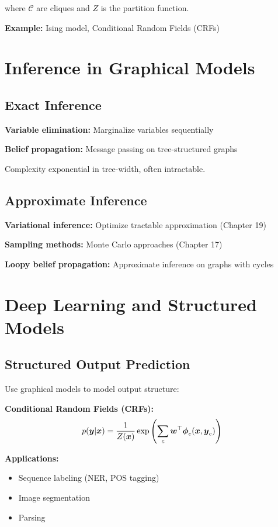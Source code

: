where $\mathcal{C}$ are cliques and $Z$ is the partition function.

\textbf{Example:} Ising model, Conditional Random Fields (CRFs)

\section{Inference in Graphical Models}
\label{sec:inference}

\subsection{Exact Inference}

\textbf{Variable elimination:} Marginalize variables sequentially

\textbf{Belief propagation:} Message passing on tree-structured graphs

Complexity exponential in tree-width, often intractable.

\subsection{Approximate Inference}

\textbf{Variational inference:} Optimize tractable approximation (Chapter 19)

\textbf{Sampling methods:} Monte Carlo approaches (Chapter 17)

\textbf{Loopy belief propagation:} Approximate inference on graphs with cycles

\section{Deep Learning and Structured Models}
\label{sec:deep-structured}

\subsection{Structured Output Prediction}

Use graphical models to model output structure:

\textbf{Conditional Random Fields (CRFs):}
\begin{equation}
p(\boldsymbol{y}|\boldsymbol{x}) = \frac{1}{Z(\boldsymbol{x})} \exp\left(\sum_c \boldsymbol{w}^\top \boldsymbol{\phi}_c(\boldsymbol{x}, \boldsymbol{y}_c)\right)
\end{equation}

\textbf{Applications:}
\begin{itemize}
    \item Sequence labeling (NER, POS tagging)
    \item Image segmentation
    \item Parsing
\end{itemize}

